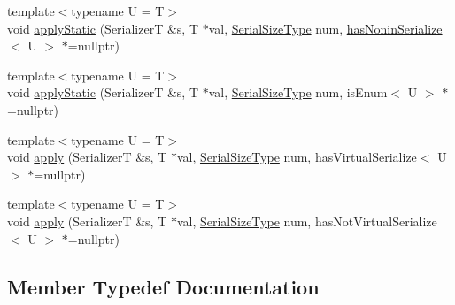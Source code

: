 \begin{DoxyCompactItemize}
\item 
{\footnotesize template$<$typename U  = T$>$ }\\void \hyperlink{structcheckpoint_1_1dispatch_1_1_serializer_dispatch_non_byte_a1bdb0ab1fae98f7c72d5770d0803494b}{apply\+Static} (SerializerT \&s, T $\ast$val, \hyperlink{namespacecheckpoint_a083f6674da3f94c2901b18c6d238217c}{Serial\+Size\+Type} num, \hyperlink{structcheckpoint_1_1dispatch_1_1_serializer_dispatch_non_byte_ad59e5c933a762ce90d1ab5f7ca04ca9f}{has\+Nonin\+Serialize}$<$ U $>$ $\ast$=nullptr)
\item 
{\footnotesize template$<$typename U  = T$>$ }\\void \hyperlink{structcheckpoint_1_1dispatch_1_1_serializer_dispatch_non_byte_a0aec94a0c69c27fc13f6dc0f923d2f50}{apply\+Static} (SerializerT \&s, T $\ast$val, \hyperlink{namespacecheckpoint_a083f6674da3f94c2901b18c6d238217c}{Serial\+Size\+Type} num, is\+Enum$<$ U $>$ $\ast$=nullptr)
\item 
{\footnotesize template$<$typename U  = T$>$ }\\void \hyperlink{structcheckpoint_1_1dispatch_1_1_serializer_dispatch_non_byte_a12e7e180be642ec9eaaac93972e28856}{apply} (SerializerT \&s, T $\ast$val, \hyperlink{namespacecheckpoint_a083f6674da3f94c2901b18c6d238217c}{Serial\+Size\+Type} num, has\+Virtual\+Serialize$<$ U $>$ $\ast$=nullptr)
\item 
{\footnotesize template$<$typename U  = T$>$ }\\void \hyperlink{structcheckpoint_1_1dispatch_1_1_serializer_dispatch_non_byte_ae6e291caec4d650a7d91e78a209a1964}{apply} (SerializerT \&s, T $\ast$val, \hyperlink{namespacecheckpoint_a083f6674da3f94c2901b18c6d238217c}{Serial\+Size\+Type} num, has\+Not\+Virtual\+Serialize$<$ U $>$ $\ast$=nullptr)
\end{DoxyCompactItemize}


\subsection{Member Typedef Documentation}
\mbox{\label{structcheckpoint_1_1dispatch_1_1_serializer_dispatch_non_byte_a7f2203710503e6ea7a5c4a565795a1d0}} 

